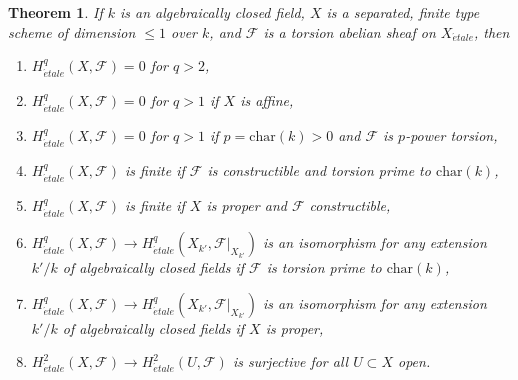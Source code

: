 \documentclass{amsart}
\theoremstyle{plain}
\newtheorem{theorem}[subsection]{Theorem}
\theoremstyle{definition}
\theoremstyle{remark}
\numberwithin{equation}{subsection}
\def\etale{{\acute{e}tale}}
\begin{document}
\begin{theorem}
\label{theorem-vanishing-affine-curves}
If $k$ is an algebraically closed field, $X$ is a separated, finite type
scheme of dimension $\leq 1$ over $k$, and $\mathcal{F}$ is a torsion
abelian sheaf on $X_\etale$, then
\begin{enumerate}
\item
$H^q_\etale(X, \mathcal{F}) = 0$ for $q > 2$,
\item
$H^q_\etale(X, \mathcal{F}) = 0$ for $q > 1$ if $X$ is affine,
\item
$H^q_\etale(X, \mathcal{F}) = 0$ for $q > 1$ if $p = \text{char}(k) > 0$
and $\mathcal{F}$ is $p$-power torsion,
\item
$H^q_\etale(X, \mathcal{F})$ is finite if $\mathcal{F}$ is
constructible and torsion prime to $\text{char}(k)$,
\item
$H^q_\etale(X, \mathcal{F})$ is finite if $X$ is proper and
$\mathcal{F}$ constructible,
\item
$H^q_\etale(X, \mathcal{F}) \to
H^q_\etale(X_{k'}, \mathcal{F}|_{X_{k'}})$ is an isomorphism
for any extension $k'/k$ of algebraically closed fields
if $\mathcal{F}$ is torsion prime to $\text{char}(k)$,
\item
$H^q_\etale(X, \mathcal{F}) \to
H^q_\etale(X_{k'}, \mathcal{F}|_{X_{k'}})$ is an isomorphism
for any extension $k'/k$ of algebraically closed fields
if $X$ is proper,
\item
$H^2_\etale(X, \mathcal{F}) \to H^2_\etale(U, \mathcal{F})$
is surjective for all $U \subset X$ open.
\end{enumerate}
\end{theorem}
\end{document}
